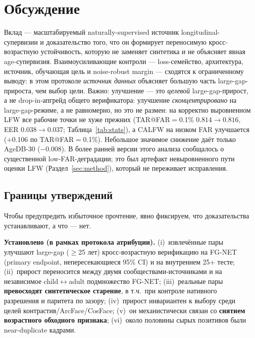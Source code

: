 \documentclass[journal]{IEEEtran}
\begin{document}
\section{Обсуждение}\label{sec:discussion}
Вклад --- масштабируемый naturally-supervised источник longitudinal-супервизии и доказательство того, что он формирует переносимую кросс-возрастную устойчивость, которую не заменяет синтетика и не объясняет явная age-супервизия. Взаимоусиливающие контроли --- loss-семейство, архитектура, источник, обучающая цель и noise-robust margin --- сходятся к ограниченному выводу: в этом протоколе \emph{источник данных} объясняет большую часть large-gap-прироста, чем выбор цели. Важно: улучшение --- это \emph{целевой} large-gap-прирост, а не drop-in-апгрейд общего верификатора: улучшение \emph{сконцентрировано} на large-gap-режиме, а не равномерно, но это не размен: на корректно выровненном LFW все рабочие точки не хуже прежних (TAR@FAR$=$0.1\% $0.814 \rightarrow 0.816$, EER $0.038 \rightarrow 0.037$; Таблица~\ref{tab:stats}), а CALFW на низком FAR улучшается ($+$0.106 по TAR@FAR$=$0.1\%). Небольшое значимое снижение даёт только AgeDB-30 ($-$0.008). В более ранней версии этого анализа сообщалось о существенной low-FAR-деградации; это был артефакт невыровненного пути оценки LFW (Раздел~\ref{sec:method}), который не переживает исправления.

\subsection{Границы утверждений}\label{sec:scope}
Чтобы предупредить избыточное прочтение, явно фиксируем, что доказательства устанавливают, а что --- нет.

\noindent\textbf{Установлено (в рамках протокола атрибуции).} (i)~извлечённые пары улучшают large-gap ($\geq$25 лет) кросс-возрастную верификацию на FG-NET (primary endpoint, непересекающиеся 95\% CI) и на внутреннем 25+ тесте; (ii)~прирост переносится между двумя сообществами-источниками и на независимое child$\leftrightarrow$adult подмножество FG-NET; (iii)~реальные пары \textbf{превосходят синтетическое старение}, в т.ч.\ при контроле нативного разрешения и паритета по зазору; (iv)~прирост инвариантен к выбору среди целей контрастив/ArcFace/CosFace; (v)~он механистически связан со \textbf{снятием возрастного обходного признака}; (vi)~около половины сырых позитивов были near-duplicate кадрами.
\end{document}
